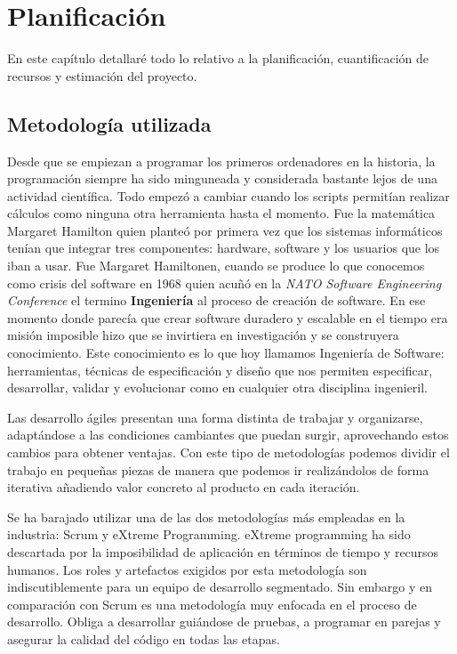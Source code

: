 \chapter{Planificación}
\label{sec:plani}
En este capítulo detallaré todo lo relativo a la planificación, cuantificación de recursos y
estimación del proyecto. 

\section{Metodología utilizada}
\label{sec:meto}
Desde que se empiezan a programar los primeros ordenadores en la historia, la programación
siempre ha sido minguneada y considerada bastante lejos de una actividad científica. Todo
empezó a cambiar cuando los scripts permitían realizar cálculos como ninguna otra
herramienta hasta el momento. Fue la matemática Margaret Hamilton quien planteó por
primera vez que los sistemas informáticos tenían que integrar tres componentes: hardware,
software y los usuarios que los iban a usar. Fue Margaret Hamiltonen, cuando se produce lo
que conocemos como crisis del software en 1968 quien acuñó en la \textit{NATO Software
Engineering Conference} el termino \textbf{Ingeniería} al proceso de creación de software. En ese
momento donde parecía que crear software duradero y escalable en el tiempo era misión
imposible hizo que se invirtiera en investigación y se construyera conocimiento. Este
conocimiento es lo que hoy llamamos Ingeniería de Software: herramientas, técnicas de
especificación y diseño que nos permiten especificar, desarrollar, validar y evolucionar
como en cualquier otra disciplina ingenieril.

Las desarrollo ágiles presentan una forma distinta de trabajar y organizarse, adaptándose
a las condiciones cambiantes que puedan surgir, aprovechando estos cambios para obtener
ventajas. Con este tipo de metodologías podemos dividir el trabajo en pequeñas piezas de
manera que podemos ir realizándolos de forma iterativa añadiendo valor concreto al
producto en cada iteración.

Se ha barajado utilizar una de las dos metodologías más empleadas en la industria: Scrum y
eXtreme Programming. eXtreme programming ha sido descartada por la imposibilidad de
aplicación en términos de tiempo y recursos humanos. Los roles y artefactos exigidos por
esta metodología son indiscutiblemente para un equipo de desarrollo segmentado. Sin
embargo y en comparación con Scrum es una metodología muy enfocada en el proceso de
desarrollo. Obliga a desarrollar guiándose de pruebas, a programar en parejas y asegurar
la calidad del código en todas las etapas.

